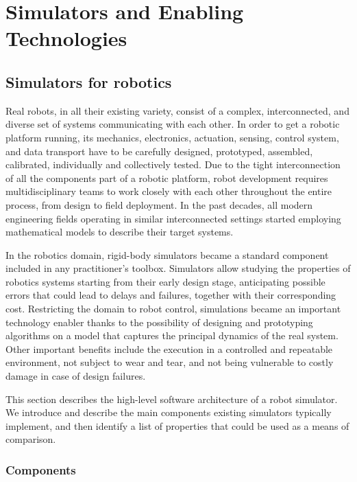 \acresetall
\chapter{Simulators and Enabling Technologies}
\label{ch:introduction}

\section{Simulators for robotics}

Real robots, in all their existing variety, consist of a complex, interconnected, and diverse set of systems communicating with each other.
In order to get a robotic platform running, its mechanics, electronics, actuation, sensing, control system, and data transport have to be carefully designed, prototyped, assembled, calibrated, individually and collectively tested.
Due to the tight interconnection of all the components part of a robotic platform, robot development requires multidisciplinary teams to work closely with each other throughout the entire process, from design to field deployment.
In the past decades, all modern engineering fields operating in similar interconnected settings started employing mathematical models to describe their target systems.

In the robotics domain, rigid-body simulators became a standard component included in any practitioner's toolbox.
Simulators allow studying the properties of robotics systems starting from their early design stage, anticipating possible errors that could lead to delays and failures, together with their corresponding cost.
Restricting the domain to robot control, simulations became an important technology enabler thanks to the possibility of designing and prototyping algorithms on a model that captures the principal dynamics of the real system.
Other important benefits include the execution in a controlled and repeatable environment, not subject to wear and tear, and not being vulnerable to costly damage in case of design failures.

This section describes the high-level software architecture of a robot simulator.
We introduce and describe the main components existing simulators typically implement, and then identify a list of properties that could be used as a means of comparison.

\subsection{Components}

